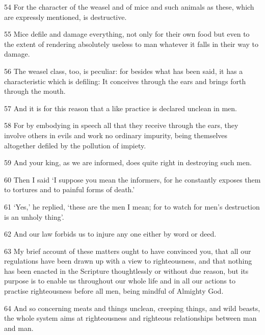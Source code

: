 \par 54 For the character of the weasel and of mice and such animals as these, which are expressly mentioned, is destructive.

\par 55 Mice defile and damage everything, not only for their own food but even to the extent of rendering absolutely useless to man whatever it falls in their way to damage.

\par 56 The weasel class, too, is peculiar: for besides what has been said, it has a characteristic which is defiling: It conceives through the ears and brings forth through the mouth.

\par 57 And it is for this reason that a like practice is declared unclean in men.

\par 58 For by embodying in speech all that they receive through the ears, they involve others in evils and work no ordinary impurity, being themselves altogether defiled by the pollution of impiety.

\par 59 And your king, as we are informed, does quite right in destroying such men.

\par 60 Then I said ‘I suppose you mean the informers, for he constantly exposes them to tortures and to painful forms of death.’

\par 61 ‘Yes,’ he replied, ‘these are the men I mean; for to watch for men's destruction is an unholy thing’.

\par 62 And our law forbids us to injure any one either by word or deed.

\par 63 My brief account of these matters ought to have convinced you, that all our regulations have been drawn up with a view to righteousness, and that nothing has been enacted in the Scripture thoughtlessly or without due reason, but its purpose is to enable us throughout our whole life and in all our actions to practise righteousness before all men, being mindful of Almighty God.

\par 64 And so concerning meats and things unclean, creeping things, and wild beasts, the whole system aims at righteousness and righteous relationships between man and man.

